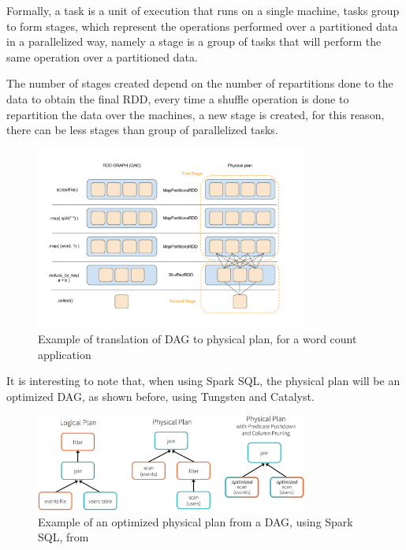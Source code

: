 \documentclass[11pt]{article} %
\begin{document}
          Formally, a task is a unit of execution that runs on a single machine, tasks group to form stages, which represent the operations performed over a partitioned data in a parallelized way, namely a stage is a group of tasks that will perform the same operation over a partitioned data.

          The number of stages created depend on the number of repartitions done to the data to obtain the final RDD, every time a shuffle operation is done to repartition the data over the machines, a new stage is created, for this reason, there can be less stages than group of parallelized tasks.

          \begin{figure}[!ht]
            \centering
            \includegraphics[width=0.8\textwidth]{DAG_to_phisical_plan.png}
            \caption{Example of translation of DAG to physical plan, for a word count application}
            \label{img:DAG_to_physical}
          \end{figure}

          It is interesting to note that, when using Spark SQL, the physical plan will be an optimized DAG, as shown before, using Tungsten and Catalyst.

          \begin{figure}[!ht]
            \centering
            \includegraphics[width=0.8\textwidth]{spark_logical_to_phisical_plan.jpg}
            \caption{Example of an optimized physical plan from a DAG, using Spark SQL, from \cite{optimized_dag_to_physical}}
          \end{figure}
\end{document}
